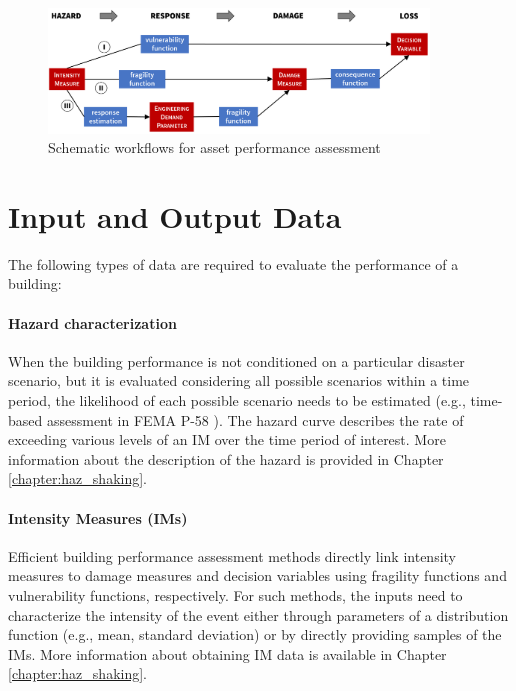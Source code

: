 \begin{figure}[htb]
    \centering
    \includegraphics[width=0.9\textwidth, angle = 0]{Figures/PBEapproaches.png}
    \caption{Schematic workflows for asset performance assessment \citep{deierlein2020cloud}}
    \label{fig:perf_PBEapproaches}
\end{figure}
 
\section{Input and Output Data}
\label{sec:perf_bldg_io}

The following types of data are required to evaluate the performance of a building:

\paragraph{Hazard characterization} When the building performance is not conditioned on a particular disaster scenario, but it is evaluated considering all possible scenarios within a time period, the likelihood of each possible scenario needs to be estimated (e.g., time-based assessment in FEMA P-58 \cite{atc2018p-58-1}). The hazard curve describes the rate of exceeding various levels of an IM over the time period of interest. More information about the description of the hazard is provided in Chapter \ref{chapter:haz_shaking}.

\paragraph{Intensity Measures (IMs)} Efficient building performance assessment methods directly link intensity measures to damage measures and decision variables using fragility functions and vulnerability functions, respectively. For such methods, the inputs need to characterize the intensity of the event either through parameters of a distribution function (e.g., mean, standard deviation) or by directly providing samples of the IMs. More information about obtaining IM data is available in Chapter \ref{chapter:haz_shaking}.

